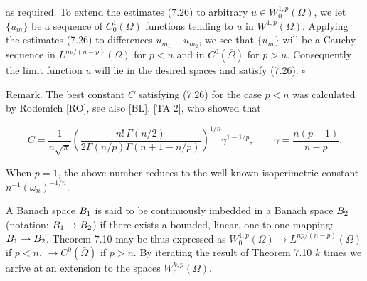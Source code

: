 \begin{theorem}
as required.
To extend the estimates (7.26) to arbitrary $u \in W_0^{1,p}(\Omega)$, we let $\{u_m\}$ be a sequence of $C_0^1(\Omega)$ functions tending to $u$ in $W^{1,p}(\Omega)$. Applying the estimates (7.26)
to differences $u_{m_1} - u_{m_2}$, we see that $\{u_m\}$ will be a Cauchy sequence in $L^{np/(n-p)}(\Omega)$
for $p < n$ and in $C^0(\overline{\Omega})$ for $p > n$. Consequently the limit function $u$ will lie in the
desired spaces and satisfy (7.26). $\square$



Remark. The best constant $C$ satisfying (7.26) for the case $p<n$ was calculated
by Rodemich [RO], see also [BL], [TA 2], who showed that

$$
C=\frac{1}{n\sqrt{\pi}}
\left(
\frac{n!\,\Gamma(n/2)}{2\Gamma(n/p)\Gamma(n+1-n/p)}
\right)^{1/n}
\gamma^{1-1/p}, \qquad \gamma=\frac{n(p-1)}{n-p}.
$$

When $p=1$, the above number reduces to the well known isoperimetric constant
$n^{-1}(\omega_n)^{-1/n}$.

A Banach space $B_1$ is said to be continuously imbedded in a Banach space
$B_2$ (notation: $B_1 \to B_2$) if there exists a bounded, linear, one-to-one mapping:
$B_1 \to B_2$. Theorem 7.10 may be thus expressed as $W_0^{1,p}(\Omega)\to L^{np/(n-p)}(\Omega)$ if
$p<n$, $\to C^0(\bar{\Omega})$ if $p>n$. By iterating the result of Theorem 7.10 $k$ times we arrive at
an extension to the spaces $W_0^{k,p}(\Omega)$.

\medskip

\end{theorem}

